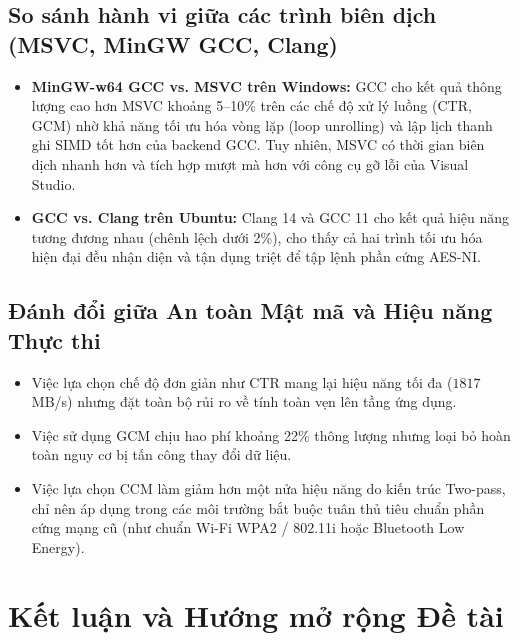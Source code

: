 \documentclass[12pt, a4paper]{report}
\begin{document}
\subsection{So sánh hành vi giữa các trình biên dịch (MSVC, MinGW GCC, Clang)}
\begin{itemize}
    \item \textbf{MinGW-w64 GCC vs. MSVC trên Windows:} GCC cho kết quả thông lượng cao hơn MSVC khoảng 5--10\% trên các chế độ xử lý luồng (CTR, GCM) nhờ khả năng tối ưu hóa vòng lặp (loop unrolling) và lập lịch thanh ghi SIMD tốt hơn của backend GCC. Tuy nhiên, MSVC có thời gian biên dịch nhanh hơn và tích hợp mượt mà hơn với công cụ gỡ lỗi của Visual Studio.
    \item \textbf{GCC vs. Clang trên Ubuntu:} Clang 14 và GCC 11 cho kết quả hiệu năng tương đương nhau (chênh lệch dưới 2\%), cho thấy cả hai trình tối ưu hóa hiện đại đều nhận diện và tận dụng triệt để tập lệnh phần cứng AES-NI.
\end{itemize}

\subsection{Đánh đổi giữa An toàn Mật mã và Hiệu năng Thực thi}
\begin{itemize}
    \item Việc lựa chọn chế độ đơn giản như CTR mang lại hiệu năng tối đa ($1817$ MB/s) nhưng đặt toàn bộ rủi ro về tính toàn vẹn lên tầng ứng dụng.
    \item Việc sử dụng GCM chịu hao phí khoảng 22\% thông lượng nhưng loại bỏ hoàn toàn nguy cơ bị tấn công thay đổi dữ liệu.
    \item Việc lựa chọn CCM làm giảm hơn một nửa hiệu năng do kiến trúc Two-pass, chỉ nên áp dụng trong các môi trường bắt buộc tuân thủ tiêu chuẩn phần cứng mạng cũ (như chuẩn Wi-Fi WPA2 / 802.11i hoặc Bluetooth Low Energy).
\end{itemize}

\section{Kết luận và Hướng mở rộng Đề tài}
\label{sec:conclusion}
\end{document}
